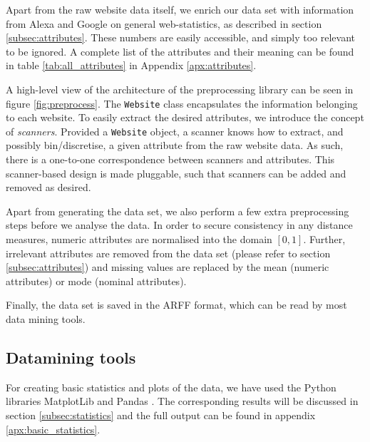 Apart from the raw website data itself, we enrich our data set with information from Alexa and Google on general web-statistics, as described in section \ref{subsec:attributes}. These numbers are easily accessible, and simply too relevant to be ignored. A complete list of the attributes and their meaning can be found in table \ref{tab:all_attributes} in Appendix \ref{apx:attributes}.

A high-level view of the architecture of the preprocessing library can be seen in figure \ref{fig:preprocess}. The \texttt{Website} class encapsulates the information belonging to each website. To easily extract the desired attributes, we introduce the concept of \textit{scanners}. Provided  a \texttt{Website} object, a scanner knows how to extract, and possibly bin/discretise, a given attribute from the raw website data. As such, there is a one-to-one correspondence between scanners and attributes. This scanner-based design is made pluggable, such that scanners can be added and removed as desired.


Apart from generating the data set, we also perform a few extra preprocessing steps before we analyse the data. In order to secure consistency in any distance measures, numeric attributes are normalised into the domain $[0, 1]$. Further, irrelevant attributes are removed from the data set (please refer to section \ref{subsec:attributes}) and missing values are replaced by the mean (numeric attributes) or mode (nominal attributes).

Finally, the data set is saved in the ARFF format, which can be read by most data mining tools.

\subsection{Datamining tools}
\label{subsec:weka}

For creating basic statistics and plots of the data, we have used the {Python} libraries {MatplotLib} and {Pandas} \cite{matplotlib, pandas}. The corresponding results will be discussed in section \ref{subsec:statistics} and the full output can be found in appendix \ref{apx:basic_statistics}.

